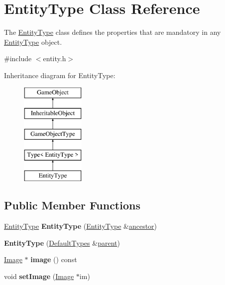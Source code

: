 \hypertarget{class_entity_type}{\section{\-Entity\-Type \-Class \-Reference}
\label{class_entity_type}
}


\-The \hyperlink{class_entity_type}{\-Entity\-Type} class defines the properties that are mandatory in any \hyperlink{class_entity_type}{\-Entity\-Type} object.  




{\ttfamily \#include $<$entity.\-h$>$}

\-Inheritance diagram for \-Entity\-Type\-:\begin{figure}[H]
\begin{center}
\leavevmode
\includegraphics[height=5.000000cm]{class_entity_type}
\end{center}
\end{figure}
\subsection*{\-Public \-Member \-Functions}
\begin{DoxyCompactItemize}
\item 
\hypertarget{class_entity_type_a18fd6a34d44c35b79c8240550d640261}{\hyperlink{class_entity_type}{\-Entity\-Type} {\bfseries \-Entity\-Type} (\hyperlink{class_entity_type}{\-Entity\-Type} \&\hyperlink{class_inheritable_object_a10eead70368227b7f15f44f91d234fa5}{ancestor})}\label{class_entity_type_a18fd6a34d44c35b79c8240550d640261}

\item 
\hypertarget{class_entity_type_ab29d9d4da2b4c187b401dbe6d07a8889}{{\bfseries \-Entity\-Type} (\hyperlink{class_default_types}{\-Default\-Types} \&\hyperlink{class_game_object_af3deaf39cde23c189765634e32e95bb4}{parent})}\label{class_entity_type_ab29d9d4da2b4c187b401dbe6d07a8889}

\item 
\hypertarget{class_entity_type_adc00417d283e8219e1530042eb0210ae}{\hyperlink{class_image}{\-Image} $\ast$ {\bfseries image} () const }\label{class_entity_type_adc00417d283e8219e1530042eb0210ae}

\item 
\hypertarget{class_entity_type_a071943ed3dc68d20b58ede71e573825e}{void {\bfseries set\-Image} (\hyperlink{class_image}{\-Image} $\ast$im)}\label{class_entity_type_a071943ed3dc68d20b58ede71e573825e}

\end{DoxyCompactItemize}


